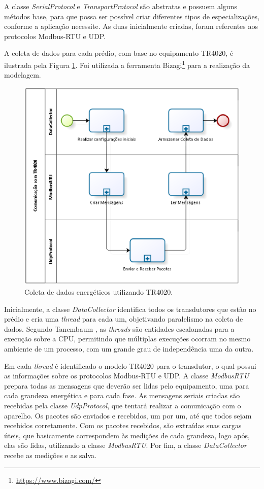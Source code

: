 A classe \textit{SerialProtocol} e \textit{TransportProtocol} são abstratas e possuem alguns métodos base, para que possa ser possível criar diferentes tipos de especializações, conforme a aplicação necessite. As duas inicialmente criadas, foram referentes aos protocolos Modbus-RTU e UDP.

A coleta de dados para cada prédio, com base no equipamento TR4020, é ilustrada pela Figura \ref{process_1}. Foi utilizada a ferramenta Bizagi\footnote{\url{https://www.bizagi.com/}} para a realização da modelagem.

\begin{figure}[!h]
    \centering
    \includegraphics[keepaspectratio=true,scale=1.0]{figuras/process_1.eps}
    \caption{Coleta de dados energéticos utilizando TR4020.}
    \label{process_1}
\end{figure}

Inicialmente, a classe \textit{DataCollector} identifica todos os transdutores que estão no prédio e cria uma \textit{thread} para cada um, objetivando paralelismo na coleta de dados. Segundo Tanembaum \cite{tanenbaum_2007}, as \textit{threads} são entidades escalonadas para a execução sobre a CPU, permitindo que múltiplas execuções ocorram no mesmo ambiente de um processo, com um grande grau de independência uma da outra.

Em cada \textit{thread} é identificado o modelo TR4020 para o transdutor, o qual possui as informações sobre os protocolos Modbus-RTU e UDP. A classe \textit{ModbusRTU} prepara todas as mensagens que deverão ser lidas pelo equipamento, uma para cada grandeza energética e para cada fase. As mensagens seriais criadas são recebidas pela classe \textit{UdpProtocol}, que tentará realizar a comunicação com o aparelho. Os pacotes são enviados e recebidos, um por um, até que todos sejam recebidos corretamente. Com os pacotes recebidos, são extraídas suas cargas úteis, que basicamente correspondem às medições de cada grandeza, logo após, elas são lidas, utilizando a classe \textit{ModbusRTU}. Por fim, a classe \textit{DataCollector} recebe as medições e as salva.

